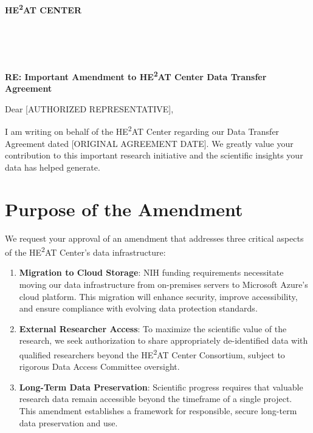 \documentclass[12pt,letterpaper]{article}
\title{}
\author{}
\date{}
\begin{document}
\begin{center}
\textbf{\Large HE\textsuperscript{2}AT CENTER}\\[1cm]
\end{center}

\noindent [DATE]

\vspace{0.5cm}

\\
\\
\noindent [ADDRESS]\\

\vspace{0.5cm}

\noindent \textbf{RE: Important Amendment to HE\textsuperscript{2}AT Center Data Transfer Agreement}

\vspace{0.5cm}

\noindent Dear [AUTHORIZED REPRESENTATIVE],

\vspace{0.3cm}

I am writing on behalf of the HE\textsuperscript{2}AT Center regarding our Data Transfer Agreement dated [ORIGINAL AGREEMENT DATE]. We greatly value your contribution to this important research initiative and the scientific insights your data has helped generate.

\section*{Purpose of the Amendment}

We request your approval of an amendment that addresses three critical aspects of the HE\textsuperscript{2}AT Center's data infrastructure:

\begin{enumerate}
\item \textbf{Migration to Cloud Storage}: NIH funding requirements necessitate moving our data infrastructure from on-premises servers to Microsoft Azure's cloud platform. This migration will enhance security, improve accessibility, and ensure compliance with evolving data protection standards.

\item \textbf{External Researcher Access}: To maximize the scientific value of the research, we seek authorization to share appropriately de-identified data with qualified researchers beyond the HE\textsuperscript{2}AT Center Consortium, subject to rigorous Data Access Committee oversight.

\item \textbf{Long-Term Data Preservation}: Scientific progress requires that valuable research data remain accessible beyond the timeframe of a single project. This amendment establishes a framework for responsible, secure long-term data preservation and use.
\end{enumerate}
\end{document}
